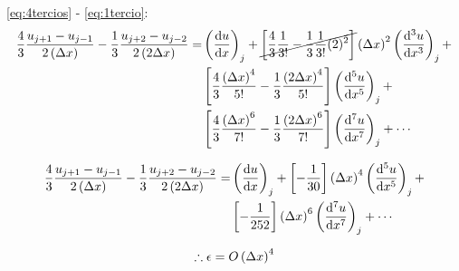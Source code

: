 \documentclass{article}
\begin{document}
\eqref{eq:4tercios} - \eqref{eq:1tercio}:
\begin{equation}
\def\u{\frac13}
\def\c{\frac43}
    \begin{split}
\c\frac{u_{j+1} - u_{j-1}}{2\Dx}-\u\frac{u_{j+2} - u_{j-2}}{2\dDx} = & \derord{u}{x} + \cancel{ \left[ \c\frac{1}{3!} - \u\frac{1}{3!}(2)^2 \right] } \Dx^2\derord[3]{u}{x} + \\
& \left[ \c\frac{\Dx^4}{5!} - \u\frac{\dDx^4}{5!} \right]\derord[5]{u}{x} + \\
& \left[ \c\frac{\Dx^6}{7!} - \u\frac{\dDx^6}{7!} \right]\derord[7]{u}{x} + \cdots
    \end{split}
\label{eq:o4}
\end{equation}

\begin{equation}
\def\u{\frac13}
\def\c{\frac43}
    \begin{split}
\c\frac{u_{j+1} - u_{j-1}}{2\Dx}-\u\frac{u_{j+2} - u_{j-2}}{2\dDx} = & \derord{u}{x} + 
\left[ -\frac{1}{30} \right]\Dx^4\derord[5]{u}{x} + \\
& \left[ -\frac{1}{252} \right]\Dx^6\derord[7]{u}{x} + \cdots
    \end{split}
\label{eq:o4_s}
\end{equation}

\begin{equation}
	\therefore \epsilon = O\left( \Delta x \right)^4
\end{equation}
\end{document}

